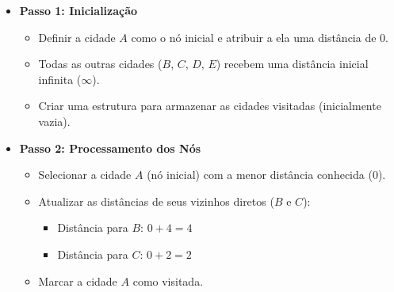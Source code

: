 \documentclass[manuscript,screen,review]{acmart}
\begin{document}
\begin{itemize}
    \item \textbf{Passo 1: Inicialização}
    \begin{itemize}
        \item Definir a cidade $A$ como o nó inicial e atribuir a ela uma distância de 0.
        \item Todas as outras cidades ($B$, $C$, $D$, $E$) recebem uma distância inicial infinita ($\infty$).
        \item Criar uma estrutura para armazenar as cidades visitadas (inicialmente vazia).
    \end{itemize}

    \item \textbf{Passo 2: Processamento dos Nós}
    \begin{itemize}
        \item Selecionar a cidade $A$ (nó inicial) com a menor distância conhecida (0).
        \item Atualizar as distâncias de seus vizinhos diretos ($B$ e $C$):
        \begin{itemize}
            \item Distância para $B$: $0 + 4 = 4$
            \item Distância para $C$: $0 + 2 = 2$
        \end{itemize}
        \item Marcar a cidade $A$ como visitada.
    \end{itemize}


\end{itemize}
\end{document}
